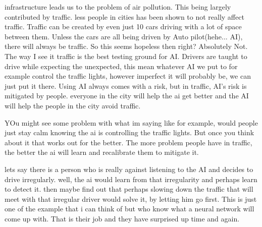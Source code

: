 infrastructure leads us to the problem of air pollution. This being largely contributed by traffic. less people in cities has been shown to not really affect traffic. Traffic can be created by even just 10 cars driving with a lot of space between them. Unless the cars are all being driven by Auto pilot(hehe... AI), there will always be traffic. So this seems hopeless then right? Absolutely Not. The way I see it traffic is the best testing ground for AI. Drivers are taught to drive while expecting the unexpected, this mean whatever AI we put to for example control the traffic lights, however imperfect it will probably be, we can just put it there. Using AI always comes with a risk, but in traffic, AI's risk is mitigated by people. everyone in the city will help the ai get better and the AI will help the people in the city avoid traffic. 

YOu might see some problem with what im saying like for example, would people just stay calm knowing the ai is controlling the traffic lights. But once you think about it that works out for the better. The more problem people have in traffic, the better the ai will learn and recalibrate them to mitigate it.

lets say there is a person who is really against listening to the AI and decides to drive irregularly. well, the ai would learn from that irregularity and perhaps learn to detect it. then maybe find out that perhaps slowing down the traffic that will meet with that irregular driver would solve it, by letting him go first. This is just one of the example that i can think of but who know what a neural network will come up with. That is their job and they have surprised up time and again.